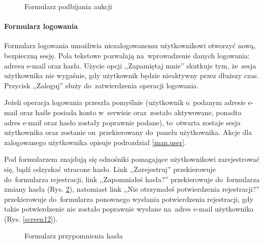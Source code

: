 \begin{figure}[h]
\centering
{}
\caption{Formularz podbijania aukcji}
\label{screen10}
\end{figure}

\paragraph{Formularz logowania}

Formularz logowania umożliwia niezalogowanemu użytkownikowi otworzyć nową, bezpieczną sesję. Pola tekstowe pozwalają na~wprowadzenie danych logowania: adresu e-mail oraz hasła. Użycie opcji ,,Zapamiętaj mnie'' skutkuje tym, że~sesja użytkownika nie wygaśnie, gdy użytkownik będzie nieaktywny przez dłuższy czas. Przycisk ,,Zaloguj'' służy do~zatwierdzenia operacji logowania.


Jeżeli operacja logowania przeszła pomyślnie (użytkownik o~podanym adresie e-mail oraz haśle posiada konto w~serwisie oraz~zostało aktywowane, ponadto adres e-mail oraz hasło zostały poprawnie podane), to~otwarta zostaje sesja użytkownika oraz zostanie on~przekierowany do~panelu użytkownika. Akcje dla zalogowanego użytkownika opisuje podrozdział \ref{man.user}.

Pod formularzem znajdują się odnośniki pomagające użytkownikowi zarejestrować się, bądź odzyskać utracone hasło. Link ,,Zarejestruj'' przekierowuje do~formularza rejestracji, link ,,Zapomniałeś hasła?'' przekierowuje do~formularza zmiany hasła (Rys. \ref{screen11}), natomiast link ,,Nie otrzymałeś potwierdzenia rejestracji?'' przekierowuje do~formularza ponownego wysłania potwierdzenia rejestracji, gdy takie potwierdzenie nie zostało poprawnie wysłane na~adres e-mail użytkownika (Rys. \ref{screen12}).

\begin{figure}[h]
\centering
{}
\caption{Formularz przypomnienia hasła}
\label{screen11}
\end{figure}

